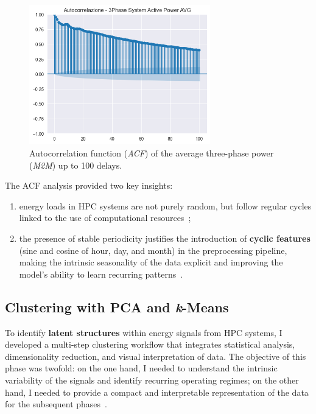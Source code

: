 \begin{figure}[H]
\centering
\includegraphics[width=0.7\textwidth]{images/autocorrelation_m2m.png}
\caption{Autocorrelation function (\emph{ACF}) of the average three-phase power (\emph{M2M}) up to 100 delays.}
\label{fig:m2m_autocorr}
\end{figure}

The ACF analysis provided two key insights:
\begin{enumerate}
  \item energy loads in HPC systems are not purely random, but follow regular cycles linked to the use of computational resources~\cite{box2015time,shumway2017time};
  \item the presence of stable periodicity justifies the introduction of \textbf{cyclic features} (sine and cosine of hour, day, and month) in the preprocessing pipeline, making the intrinsic seasonality of the data explicit and improving the model's ability to learn recurring patterns~\cite{bishop2006pattern,hastie2009elements}.
\end{enumerate}

\subsection{Clustering with PCA and \textit{k}-Means}

To identify \textbf{latent structures} within energy signals from HPC systems, I developed a multi-step clustering workflow that integrates statistical analysis, dimensionality reduction, and visual interpretation of data.  
The objective of this phase was twofold: on the one hand, I needed to understand the intrinsic variability of the signals and identify recurring operating regimes; on the other hand, I needed to provide a compact and interpretable representation of the data for the subsequent phases~\cite{bishop2006pattern,hastie2009elements,han2011data,aggarwal2015data}.

